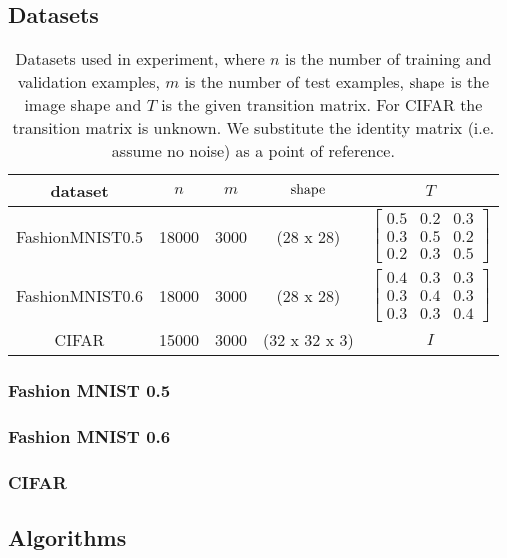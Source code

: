 \documentclass{article} %
\begin{document}
\subsection{Datasets}
\begin{table}\begin{tabular}{ccccc} dataset & $n$ & $m$ & $\textup{shape}$ & $T$ \\\hline
FashionMNIST0.5 & 18000 & 3000 & (28 x 28) & $\begin{bmatrix}0.5 & 0.2 & 0.3\\0.3 & 0.5 & 0.2\\0.2 & 0.3 & 0.5\end{bmatrix}$\\
FashionMNIST0.6 & 18000 & 3000 & (28 x 28) & $\begin{bmatrix}0.4 & 0.3 & 0.3\\0.3 & 0.4 & 0.3\\0.3 & 0.3 & 0.4\end{bmatrix}$\\
CIFAR & 15000 & 3000 & (32 x 32 x 3) & $I$
\end{tabular}\caption{
  Datasets used in experiment, where $n$ is the number of training and validation examples, $m$ is the number of test examples, $\textup{shape}$ is the image shape and $T$ is the given transition matrix. For CIFAR the transition matrix is unknown. We substitute the identity matrix (i.e. assume no noise) as a point of reference.
  \label{tab:dataset}
}\end{table}

\subsubsection{Fashion MNIST 0.5}

\subsubsection{Fashion MNIST 0.6}

\subsubsection{CIFAR}

\subsection{Algorithms}
\end{document}

